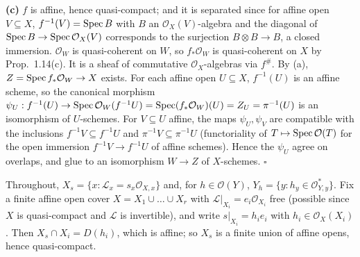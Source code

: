 \documentclass[11pt]{article}
\begin{document}
\textbf{(c)} $f$ is affine, hence quasi-compact; and it is separated since for affine open $V\subseteq X$, $f^{-1}(V)=\operatorname{Spec} B$ with $B$ an $\mathcal O_X(V)$-algebra and the diagonal of $\operatorname{Spec} B\to\operatorname{Spec}\mathcal O_X(V)$ corresponds to the surjection $B\otimes B\to B$, a closed immersion. $\mathcal O_W$ is quasi-coherent on $W$, so $f_*\mathcal O_W$ is quasi-coherent on $X$ by Prop.~1.14(c). It is a sheaf of commutative $\mathcal O_X$-algebras via $f^\#$. By (a), $Z=\operatorname{Spec} f_*\mathcal O_W\to X$ exists. For each affine open $U\subseteq X$, $f^{-1}(U)$ is an affine scheme, so the canonical morphism $\psi_U:f^{-1}(U)\to\operatorname{Spec}\mathcal O_W(f^{-1}U)=\operatorname{Spec}(f_*\mathcal O_W)(U)=Z_U=\pi^{-1}(U)$ is an isomorphism of $U$-schemes. For $V\subseteq U$ affine, the maps $\psi_U,\psi_V$ are compatible with the inclusions $f^{-1}V\subseteq f^{-1}U$ and $\pi^{-1}V\subseteq\pi^{-1}U$ (functoriality of $T\mapsto\operatorname{Spec}\mathcal O(T)$ for the open immersion $f^{-1}V\to f^{-1}U$ of affine schemes). Hence the $\psi_U$ agree on overlaps, and glue to an isomorphism $W\to Z$ of $X$-schemes. \hfill$\square$

\pf
Throughout, $X_s=\{x:\mathcal L_x=s_x\mathcal O_{X,x}\}$ and, for $h\in\mathcal O(Y)$, $Y_h=\{y:h_y\in\mathcal O_{Y,y}^*\}$. Fix a finite affine open cover $X=X_1\cup\dots\cup X_r$ with $\mathcal L|_{X_i}=e_i\mathcal O_{X_i}$ free (possible since $X$ is quasi-compact and $\mathcal L$ is invertible), and write $s|_{X_i}=h_ie_i$ with $h_i\in\mathcal O_X(X_i)$. Then $X_s\cap X_i=D(h_i)$, which is affine; so $X_s$ is a finite union of affine opens, hence quasi-compact.
\end{document}
